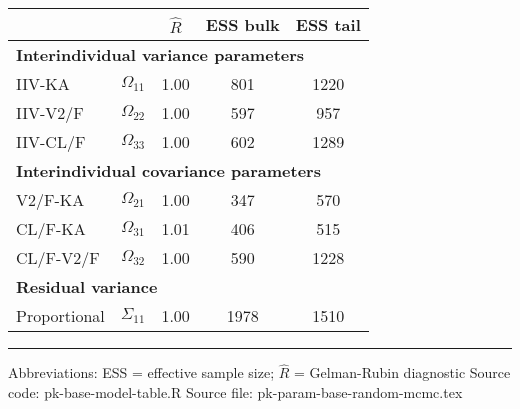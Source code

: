 \setlength{\tabcolsep}{5pt} 
\begin{threeparttable}
\renewcommand{\arraystretch}{1.3}
\begin{tabular}[h]{lcccc}
\hline
 &  & $\hat{R}$ & ESS bulk & ESS tail \\
\hline
\multicolumn{5}{l}{\textbf{Interindividual variance parameters}}\\%
IIV-KA & $\Omega_{11}$ & 1.00 & 801 & 1220 \\
IIV-V2/F & $\Omega_{22}$ & 1.00 & 597 & 957 \\
IIV-CL/F & $\Omega_{33}$ & 1.00 & 602 & 1289 \\
\hline \multicolumn{5}{l}{\textbf{Interindividual covariance parameters}}\\%
V2/F-KA & $\Omega_{21}$ & 1.00 & 347 & 570 \\
CL/F-KA & $\Omega_{31}$ & 1.01 & 406 & 515 \\
CL/F-V2/F & $\Omega_{32}$ & 1.00 & 590 & 1228 \\
\hline \multicolumn{5}{l}{\textbf{Residual variance}}\\%
Proportional & $\Sigma_{11}$ & 1.00 & 1978 & 1510 \\
\hline
\end{tabular}
\end{threeparttable}
 
\vspace{0.67cm}
 
\begin{minipage}{1\linewidth}
\linespread{1.1}\selectfont
\rule{1\linewidth}{0.4pt}
\vspace{0.02cm}
Abbreviations: 
  ESS = effective sample size;
  $\hat{R}$ = Gelman-Rubin diagnostic \newline
Source code: pk-base-model-table.R \newline
Source file: pk-param-base-random-mcmc.tex \newline
\end{minipage}
